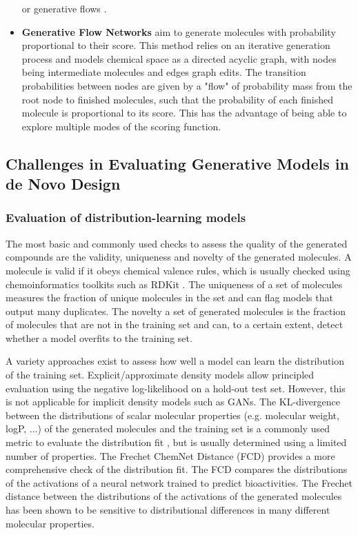 \begin{itemize}
            or generative flows \citep{madhawaGraphNVPInvertibleFlow2019}.
      \item \textbf{Generative Flow Networks} \citep{bengioFlowNetworkBased2021} aim to generate
            molecules with probability proportional to their score. This method relies on an
            iterative generation process and models chemical space as a directed acyclic graph, with
            nodes being intermediate molecules and edges graph edits. The transition probabilities
            between nodes are given by a "flow" of probability mass from the root node to finished
            molecules, such that the probability of each finished molecule is proportional to its
            score. This has the advantage of being able to explore multiple modes of the scoring
            function.
\end{itemize}

\subsection{Challenges in Evaluating Generative Models in de Novo Design}
\subsubsection{Evaluation of distribution-learning models}
The most basic and commonly used checks to assess the quality of the generated compounds are the
validity, uniqueness and novelty of the generated molecules. A molecule is valid if it obeys
chemical valence rules, which is usually checked using chemoinformatics toolkits such as RDKit
\citep{landrumRDKitOpensourceCheminformatics2006}. The uniqueness of a set of molecules measures the
fraction of unique molecules in the set and can flag models that output many duplicates. The novelty
a set of generated molecules is the fraction of molecules that are not in the training set and can,
to a certain extent, detect whether a model overfits to the training set.

A variety approaches exist to assess how well a model can learn the distribution of the training
set. Explicit/approximate density models allow principled evaluation using the negative
log-likelihood on a hold-out test set. However, this is not applicable for implicit density models
such as GANs. The KL-divergence between the distributions of scalar molecular properties (e.g.
molecular weight, logP, ...) of the generated molecules and the training set is a commonly used
metric to evaluate the distribution fit \citep{brownGuacaMolBenchmarkingModels2019}, but is usually
determined using a limited number of properties. The Frechet ChemNet Distance (FCD)
\citep{preuerFrechetChemNetDistance2018} provides a more comprehensive check of the distribution
fit. The FCD compares the distributions of the activations of a neural network trained to predict
bioactivities. The Frechet distance between the distributions of the activations of the generated
molecules has been shown to be sensitive to distributional differences in many different molecular
properties.

